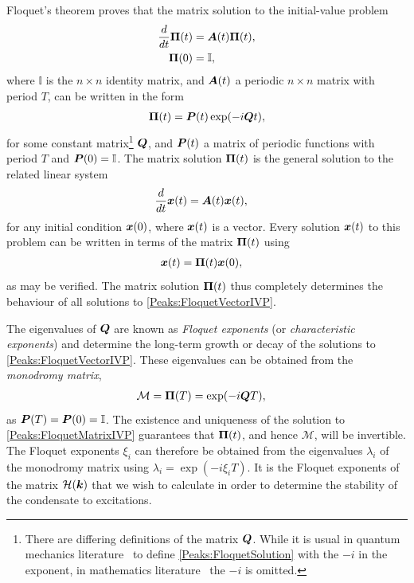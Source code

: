 Floquet's theorem proves that the matrix solution to the initial-value problem
\begin{subequations}
    \label{Peaks:FloquetMatrixIVP}
    \begin{align}
        \frac{d}{dt}\vect{\Pi}(t) &= \vect{A}(t) \vect{\Pi}(t),\\
        \vect{\Pi}(0) &= \mathbb{I},
    \end{align}
\end{subequations}
where $\mathbb{I}$ is the $n \times n$ identity matrix, and $\bm{A}(t)$ a periodic $n \times n$ matrix with period $T$, can be written in the form
\begin{align}
    \vect{\Pi}(t) = \vect{P}(t) \exp(-i\vect{Q} t),
    \label{Peaks:FloquetSolution}
\end{align}
for some constant matrix\footnote{There are differing definitions of the matrix $\bm{Q}$. While it is usual in quantum mechanics literature~\citep{Shirley:1965,Hanggi:1998,Garrison:1999} to define \eqref{Peaks:FloquetSolution} with the $-i$ in the exponent, in mathematics literature~\citep{Moulton:1958,AppliedNonlinearDynamics} the $-i$ is omitted.} $\bm{Q}$, and $\bm{P}(t)$ a matrix of periodic functions with period $T$ and $\bm{P}(0) = \mathbb{I}$. The matrix solution $\bm{\Pi}(t)$ is the general solution to the related linear system
\begin{align}
    \frac{d}{dt}\vect{x}(t) &= \vect{A}(t) \vect{x}(t),
    \label{Peaks:FloquetVectorIVP}
\end{align}
for any initial condition $\bm{x}(0)$, where $\bm{x}(t)$ is a vector. Every solution $\bm{x}(t)$ to this problem can be written in terms of the matrix $\bm{\Pi}(t)$ using
\begin{align}
    \bm{x}(t) &= \bm{\Pi}(t) \bm{x}(0),
\end{align}
as may be verified. The matrix solution $\bm{\Pi}(t)$ thus completely determines the behaviour of all solutions to \eqref{Peaks:FloquetVectorIVP}.

The eigenvalues of $\bm{Q}$ are known as \emph{Floquet exponents} (or \emph{characteristic exponents}) and determine the long-term growth or decay of the solutions to \eqref{Peaks:FloquetVectorIVP}. These eigenvalues can be obtained from the \emph{monodromy matrix},
\begin{align}
    \label{Peaks:MonodromyMatrix}
    \mathcal{M} &= \vect{\Pi}(T) = \exp(-i\vect{Q} T),
\end{align}
as $\bm{P}(T) = \bm{P}(0) = \mathbb{I}$. The existence and uniqueness of the solution to \eqref{Peaks:FloquetMatrixIVP} guarantees that $\bm{\Pi}(t)$, and hence $\mathcal{M}$, will be invertible. The Floquet exponents $\xi_i$ can therefore be obtained from the eigenvalues $\lambda_i$ of the monodromy matrix using $\lambda_i = \exp(-i\xi_i T)$.  It is the Floquet exponents of the matrix $\mathcal{H}(\bm{k})$ that we wish to calculate in order to determine the stability of the condensate to excitations.

